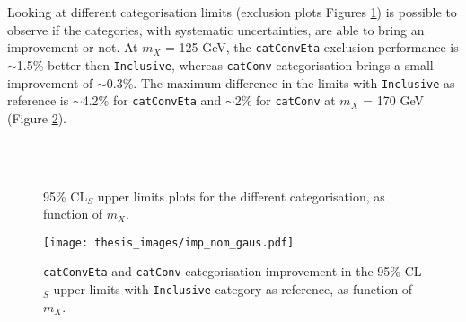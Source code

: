 \documentclass[a4paper, oneside, 11pt, openright]{book}
\begin{document}
 			
 			Looking at different categorisation limits (exclusion plots Figures \ref{fig:limits_cat}) is possible to observe if the categories, with systematic uncertainties, are able to bring an improvement or not. At $m_X$ = 125 GeV, the \texttt{catConvEta} exclusion performance is $\sim$1.5\% better then \texttt{Inclusive}, whereas \texttt{catConv} categorisation brings a small improvement of $\sim$0.3\%. The maximum difference in the limits with \texttt{Inclusive} as reference is $\sim$4.2\% for \texttt{catConvEta} and $\sim$2\% for \texttt{catConv} at $m_X$ = 170 GeV (Figure \ref{fig:limits_comp}).
 			\begin{figure}
 				\centering
 				\\			
 				\\	
 				\caption{95\% CL$_S$ upper limits plots for the different categorisation, as function of $m_X$.}
 				\label{fig:limits_cat}
 			\end{figure}
 			\begin{figure}
 				\centering
 				\texttt{[image: thesis\_images/imp\_nom\_gaus.pdf]}
 				\caption{\texttt{catConvEta} and \texttt{catConv} categorisation improvement in the 95\% CL$_S$ upper limits with \texttt{Inclusive} category as reference, as function of $m_X$.}
 				\label{fig:limits_comp}
 			\end{figure}
 		 
 	
 			
\end{document}
